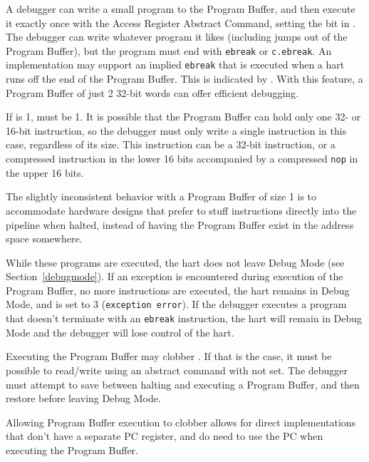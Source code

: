 A debugger can write a small program to the Program Buffer, and then
execute it exactly once with the Access Register Abstract Command,
setting the \FacAccessregisterPostexec bit in \RdmCommand.
The debugger can write whatever program it likes (including jumps out of the
Program Buffer), but the program must end with
{\tt ebreak} or {\tt c.ebreak}. An implementation may support
an implied {\tt ebreak} that is executed when a hart runs off the end of the
Program Buffer. This is indicated by \FdmDmstatusImpebreak. With this feature, a Program
Buffer of just 2 32-bit words can offer efficient debugging.

If \FdmAbstractcsProgbufsize is 1, \FdmDmstatusImpebreak must be 1. It is possible that the Program
Buffer can hold only one 32- or 16-bit instruction, so the debugger must only
write a single instruction in this case, regardless of its size.
This instruction can be a 32-bit
instruction, or a compressed instruction in the lower 16 bits accompanied by a
compressed {\tt nop} in the upper 16 bits.

\begin{commentary}
    The slightly inconsistent behavior with a Program Buffer of size 1 is to
    accommodate hardware designs that prefer to stuff instructions directly
    into the pipeline when halted, instead of having the Program Buffer exist
    in the address space somewhere.
\end{commentary}

While these programs are executed, the hart does not leave Debug Mode (see
Section~\ref{debugmode}).  If an exception is encountered during execution of
the Program Buffer, no more instructions are executed, the hart remains in Debug
Mode, and \FdmAbstractcsCmderr is set to 3 ({\tt exception error}).  If the debugger
executes a program that doesn't terminate with an {\tt ebreak} instruction, the
hart will remain in Debug Mode and the debugger will lose control of the hart.

Executing the Program Buffer may clobber \RcsrDpc. If that is the case, it must be
possible to read/write \RcsrDpc using an abstract command with \FacAccessregisterPostexec not set.
The debugger must attempt to save \RcsrDpc between halting and
executing a Program Buffer, and then restore \RcsrDpc before leaving Debug Mode.

\begin{commentary}
    Allowing Program Buffer execution to clobber \RcsrDpc allows for direct
    implementations that don't have a separate PC register, and do need to use
    the PC when executing the Program Buffer.
\end{commentary}

